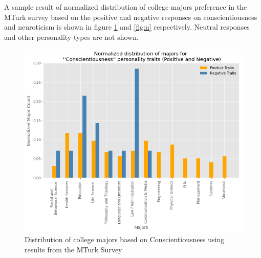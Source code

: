 \documentclass[conference]{IEEEtran}
\begin{document}
A sample result of normalized distribution of college majors preference in the MTurk survey based on
the positive and negative responses on conscientiousness and neuroticism is shown in figure \ref{fig:c} and \ref{fig:n} respectively. Neutral responses and other personality types are not shown.




\begin{figure}[h]
\includegraphics[scale=0.4]{figs/c.png}
\caption{Distribution of college majors based on Conscientiousness  using results from the MTurk Survey}
\label{fig:c}
\centering
\end{figure}


\end{document}
